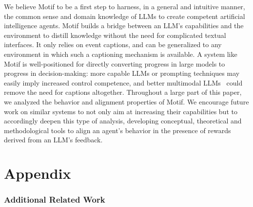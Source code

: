 \documentclass{article} %
\begin{document}
We believe Motif to be a first step to harness, in a general and intuitive manner, the common sense and domain knowledge of LLMs to create competent artificial intelligence agents.
Motif builds a bridge between an LLM's capabilities and the environment to distill knowledge without the need for complicated textual interfaces. It only relies on event captions, and can be generalized to any environment in which such a captioning mechanism is available.
A system like Motif is well-positioned for directly converting progress in large models to progress in decision-making: more capable LLMs or prompting techniques may easily imply increased control competence, and better multimodal LLMs~\citep{alayrac2022flamingo,manas2023mapl} could remove the need for captions altogether.
Throughout a large part of this paper, we analyzed the behavior and alignment properties of Motif.
We encourage future work on similar systems to not only aim at increasing their capabilities but to accordingly deepen this type of analysis, developing conceptual, theoretical and methodological tools to align an agent's behavior in the presence of rewards derived from an LLM's feedback.

\newpage




\newpage
{} %
\part{Appendix} %
\parttoc %

\newpage
\appendix

\section{Additional Related Work}
\label{appendix:additional-related-work}
\end{document}
